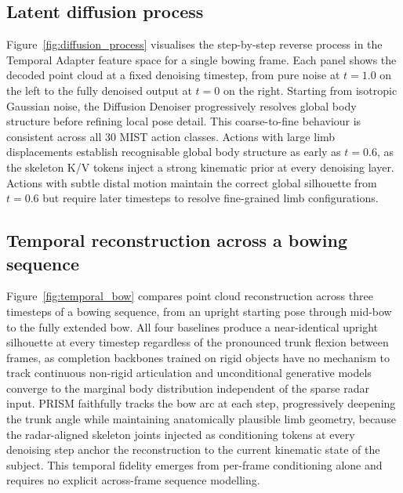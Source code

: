 \documentclass{article}
\begin{document}
\subsection{Latent diffusion process}
\label{app:diffusion}

Figure~\ref{fig:diffusion_process} visualises the step-by-step reverse process
in the Temporal Adapter feature space for a single bowing frame.
Each panel shows the decoded point cloud at a fixed denoising timestep, from
pure noise at $t\!=\!1.0$ on the left to the fully denoised output at $t\!=\!0$
on the right.
Starting from isotropic Gaussian noise, the Diffusion Denoiser
progressively resolves global body structure before refining local pose detail.
This coarse-to-fine behaviour is consistent across all 30 MIST action classes.
Actions with large limb displacements establish recognisable global body structure as early as
$t\!=\!0.6$, as the skeleton K/V tokens inject a strong kinematic prior at every
denoising layer.
Actions with subtle distal motion maintain the correct global silhouette from
$t\!=\!0.6$ but require later timesteps to resolve fine-grained limb configurations.

\subsection{Temporal reconstruction across a bowing sequence}
\label{app:teaser}

Figure~\ref{fig:temporal_bow} compares point cloud reconstruction across three
timesteps of a bowing sequence, from an upright starting pose through mid-bow
to the fully extended bow.
All four baselines produce a near-identical upright silhouette at every timestep
regardless of the pronounced trunk flexion between frames, as completion backbones
trained on rigid objects have no mechanism to track continuous non-rigid articulation
and unconditional generative models converge to the marginal body distribution
independent of the sparse radar input.
PRISM faithfully tracks the bow arc at each step, progressively deepening the
trunk angle while maintaining anatomically plausible limb geometry, because the
radar-aligned skeleton joints injected as conditioning tokens at every denoising
step anchor the reconstruction to the current kinematic state of the subject.
This temporal fidelity emerges from per-frame conditioning alone and requires no
explicit across-frame sequence modelling.




\newpage

\end{document}
